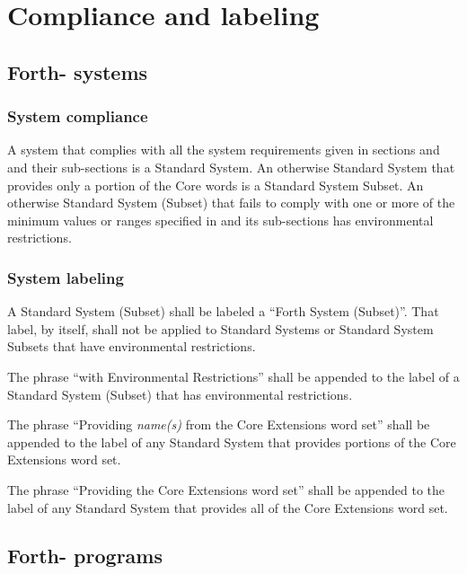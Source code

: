 \chapter{Compliance and labeling}
\label{label}

\cbstart{}
\section[Forth-\snapshot systems]{Forth-\snapshot{} systems} %
\label{label:label}
\cbend

\subsection{System compliance} %
\label{label:system}

A system that complies with all the system requirements given in
sections  and  and their sub-sections is
a Standard System. An otherwise Standard System that provides only
a portion of the Core words is a Standard System Subset. An
otherwise Standard System (Subset) that fails to comply with one or
more of the minimum values or ranges specified in  and
its sub-sections has environmental restrictions.

\subsection{System labeling} %

A Standard System (Subset) shall be labeled a ``Forth System
(Subset)''. That label, by itself, shall not be applied to Standard
Systems or Standard System Subsets that have environmental
restrictions.

The phrase ``with Environmental Restrictions'' shall be appended to
the label of a Standard System (Subset) that has environmental
restrictions.

The phrase ``Providing \emph{name(s)} from the Core Extensions word
set'' shall be appended to the label of any Standard System that
provides portions of the Core Extensions word set.

The phrase ``Providing the Core Extensions word set'' shall be
appended to the label of any Standard System that provides all of
the Core Extensions word set.

\cbstart{}
\section[Forth-\snapshot programs]{Forth-\snapshot{} programs} %
\cbend
